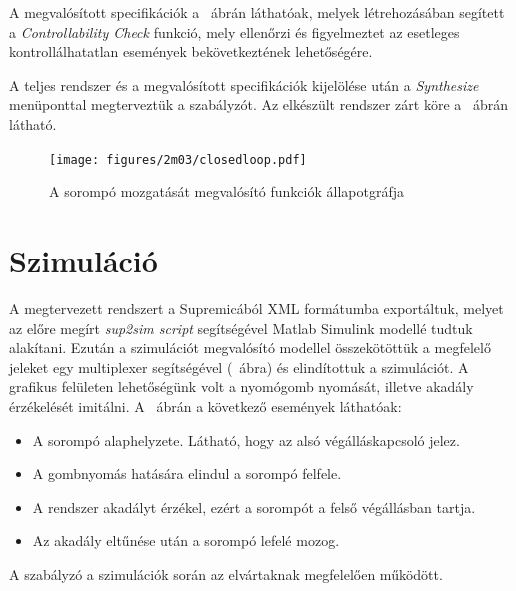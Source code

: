 A megvalósított specifikációk a ~ábrán láthatóak, melyek létrehozásában segített a \textit{Controllability Check} funkció, mely ellenőrzi és figyelmeztet az esetleges kontrollálhatatlan események bekövetkeztének lehetőségére.

A teljes rendszer és a megvalósított specifikációk kijelölése után a \textit{Synthesize} menüponttal megterveztük a szabályzót. Az elkészült rendszer zárt köre a ~ábrán látható.

\begin{figure}
	\centering
	\texttt{[image: figures/2m03/closedloop.pdf]}
	\caption{A sorompó mozgatását megvalósító funkciók állapotgráfja}
	\label{fig:ClosedLoop}
\end{figure}

\section{Szimuláció}
A megtervezett rendszert a Supremicából XML formátumba exportáltuk, melyet az előre megírt \textit{sup2sim script} segítségével Matlab Simulink modellé tudtuk alakítani. Ezután a szimulációt megvalósító modellel összekötöttük a megfelelő jeleket egy multiplexer segítségével (~ábra) és elindítottuk a szimulációt. A grafikus felületen lehetőségünk volt a nyomógomb nyomását, illetve akadály érzékelését imitálni.
A ~ábrán a következő események láthatóak:
\begin{itemize}
	\item A sorompó alaphelyzete. Látható, hogy az alsó végálláskapcsoló jelez.
	\item A gombnyomás hatására elindul a sorompó felfele.
	\item A rendszer akadályt érzékel, ezért a sorompót a felső végállásban tartja.
	\item Az akadály eltűnése után a sorompó lefelé mozog.
\end{itemize}

A szabályzó a szimulációk során az elvártaknak megfelelően működött.



